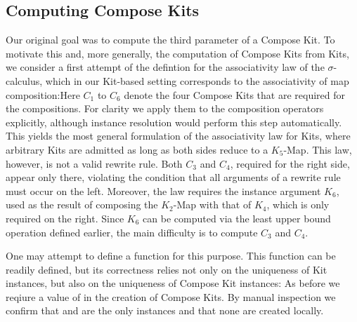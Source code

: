 \documentclass[screen,nonacm]{acmart}
\begin{document}
\subsection{Computing Compose Kits}\label{sec:ags-cck}
Our original goal was to compute the third parameter of a Compose Kit. To
motivate this and, more generally, the computation of Compose Kits from Kits,
we consider a first attempt of the defintion for the associativity law of the
$\sigma$-calculus, which in our Kit-based setting corresponds to the
associativity of map composition:\AAssocTryO{}Here $C_1$ to $C_6$ denote the
four Compose Kits that are required for the compositions. For clarity we apply
them to the composition operators explicitly, although instance resolution
would perform this step automatically. This yields the most general formulation
of the associativity law for Kits, where arbitrary Kits are admitted as long as
both sides reduce to a $K_5$-Map. This law, however, is not a valid rewrite
rule. Both $C_3$ and $C_4$, required for the right side, appear only there,
violating the condition that all arguments of a rewrite rule must occur on the
left. Moreover, the law requires the instance argument $K_6$, used as the
result of composing the $K_2$-Map with that of $K_4$, which is only required on
the right. Since $K_6$ can be computed via the least upper bound operation
defined earlier, the main difficulty is to compute $C_3$ and $C_4$.

One may attempt to define a function \ACompCKitSafe{} for this purpose. This
function can be readily defined, but its correctness relies not only on the
uniqueness of Kit instances, but also on the uniqueness of Compose Kit
instances:\AUniqueCKits{} As before we reqiure a value of 
in the creation of Compose Kits. By manual inspection we confirm that
 and  are the only instances and that none
are created locally.
\end{document}
